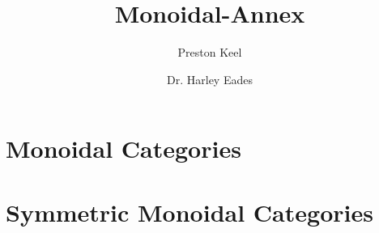 \documentclass[11pt]{article}
\title{Monoidal-Annex}
\author{Preston Keel \and Dr. Harley Eades}
\begin{document}
\maketitle
\tableofcontents

\section{Monoidal Categories}
\label{sec:monoidal_categories}


\section{Symmetric Monoidal Categories}
\label{sec:symmetric_monoidal_categories}




\end{document}
